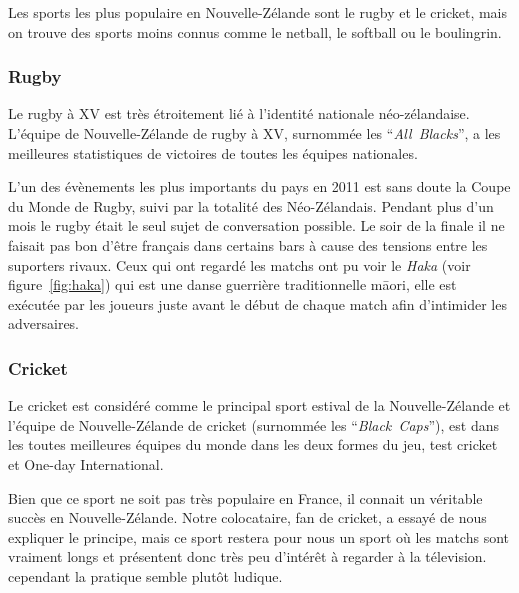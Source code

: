 \documentclass[11pt,journal]{RapportFR}
\newcommand{\Nz}{Nouvelle-Z\'elande\xspace}
\newcommand{\Nzs}{N\'eo-Z\'elandais\xspace}
\begin{document}
Les sports les plus populaire en \Nz sont le rugby et le cricket, mais on trouve des sports moins connus comme le netball, le softball ou le boulingrin.

\vspace{2mm}
\subsubsection{Rugby}
\label{subsub:rugby}

Le rugby à XV est très étroitement lié à l'identité nationale néo-zélandaise. L'équipe de Nouvelle-Zélande de rugby à XV, surnommée les ``\textit{All~Blacks}'', a les meilleures statistiques de victoires de toutes les équipes nationales.

L'un des \'ev\`enements les plus importants du pays en 2011 est sans doute la Coupe du Monde de Rugby, suivi par la totalit\'e des \Nzs. Pendant plus d'un mois le rugby \'etait le seul sujet de conversation possible.
Le soir de la finale il ne faisait pas bon d'\^etre fran\c{c}ais dans certains bars \`a cause des tensions entre les suporters rivaux.
Ceux qui ont regard\'e les matchs ont pu voir le \emph{Haka} (voir figure~\ref{fig:haka}) qui est une danse guerrière traditionnelle m\=aori, elle est exécutée par les joueurs juste avant le début de chaque match afin d'intimider les adversaires.

\vspace{-5mm}
\subsubsection{Cricket}
\label{subsub:cricket}

Le cricket est considéré comme le principal sport estival de la Nouvelle-Zélande et l'équipe de Nouvelle-Zélande de cricket (surnommée les ``\textit{Black~Caps}''), est dans les toutes meilleures équipes du monde dans les deux formes du jeu, test cricket et One-day International. 

\vspace{-8mm}

Bien que ce sport ne soit pas tr\`es populaire en France, il connait un v\'eritable succ\`es en \Nz. %
Notre colocataire, fan de cricket, a essay\'e de nous expliquer le principe, mais ce sport restera pour nous un sport o\`u les matchs sont vraiment longs et pr\'esentent donc tr\`es peu d'int\'er\^et \`a regarder \`a la t\'elevision. cependant la pratique semble plut\^ot ludique.
\end{document}
